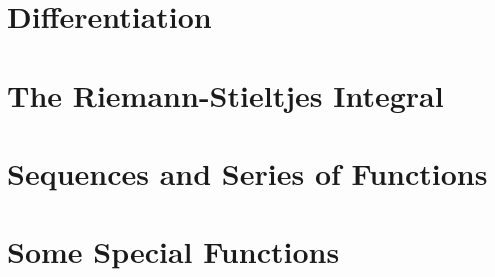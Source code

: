 \documentclass[UTF8]{ctexart}
\theoremstyle{thm}
\theoremstyle{dfn}
\theoremstyle{named}
\begin{document}
\section{Differentiation}







\newpage

\section{The Riemann-Stieltjes Integral}

% 
% 
% 
% 
\newpage

\section{Sequences and Series of Functions}
% 
% 
% 
% 
% 
% 
% 
\newpage

\section{Some Special Functions}
% 
% 
% 
% 
% 
% 
\newpage
\end{document}
